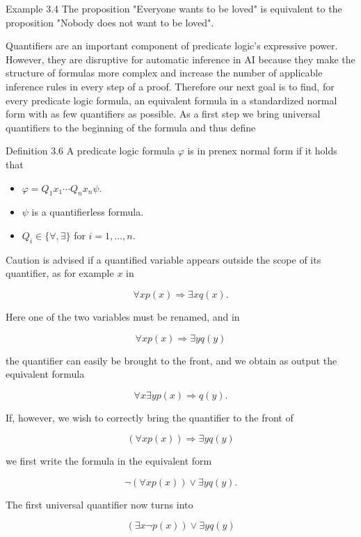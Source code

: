 \documentclass[10pt]{article}
\begin{document}
Example 3.4 The proposition "Everyone wants to be loved" is equivalent to the proposition "Nobody does not want to be loved".

Quantifiers are an important component of predicate logic's expressive power. However, they are disruptive for automatic inference in AI because they make the structure of formulas more complex and increase the number of applicable inference rules in every step of a proof. Therefore our next goal is to find, for every predicate logic formula, an equivalent formula in a standardized normal form with as few quantifiers as possible. As a first step we bring universal quantifiers to the beginning of the formula and thus define

Definition 3.6 A predicate logic formula $\varphi$ is in prenex normal form if it holds that

\begin{itemize}
  \item $\varphi=Q_{1} x_{1} \cdots Q_{n} x_{n} \psi$.
  \item $\psi$ is a quantifierless formula.
  \item $Q_{i} \in\{\forall, \exists\}$ for $i=1, \ldots, n$.
\end{itemize}

Caution is advised if a quantified variable appears outside the scope of its quantifier, as for example $x$ in

$$
\forall x p(x) \Rightarrow \exists x q(x) .
$$

Here one of the two variables must be renamed, and in

$$
\forall x p(x) \Rightarrow \exists y q(y)
$$

the quantifier can easily be brought to the front, and we obtain as output the equivalent formula

$$
\forall x \exists y p(x) \Rightarrow q(y) .
$$

If, however, we wish to correctly bring the quantifier to the front of


\begin{equation*}
(\forall x p(x)) \Rightarrow \exists y q(y) \tag{3.4}
\end{equation*}


we first write the formula in the equivalent form

$$
\neg(\forall x p(x)) \vee \exists y q(y) .
$$

The first universal quantifier now turns into

$$
(\exists x \neg p(x)) \vee \exists y q(y)
$$
\end{document}
